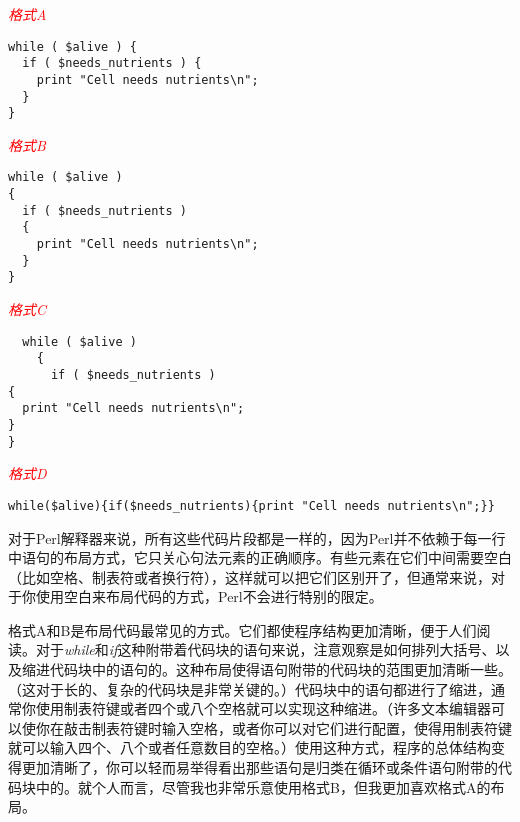 \textcolor{red}{\textit{格式A}}
\begin{adjustwidth}{4em}{}
\begin{lstlisting}
while ( $alive ) {
  if ( $needs_nutrients ) {
    print "Cell needs nutrients\n";
  }
}
\end{lstlisting}
\end{adjustwidth}

\textcolor{red}{\textit{格式B}}
\begin{adjustwidth}{4em}{}
\begin{lstlisting}
while ( $alive )
{
  if ( $needs_nutrients )
  {
    print "Cell needs nutrients\n";
  }
}
\end{lstlisting}
\end{adjustwidth}

\textcolor{red}{\textit{格式C}}
\begin{adjustwidth}{4em}{}
\begin{lstlisting}
  while ( $alive )
    {
      if ( $needs_nutrients )
{
  print "Cell needs nutrients\n";
}
}
\end{lstlisting}
\end{adjustwidth}

\textcolor{red}{\textit{格式D}}
\begin{adjustwidth}{4em}{}
\begin{lstlisting}
while($alive){if($needs_nutrients){print "Cell needs nutrients\n";}}
\end{lstlisting}
\end{adjustwidth}

对于Perl解释器来说，所有这些代码片段都是一样的，因为Perl并不依赖于每一行中语句的布局方式，它只关心句法元素的正确顺序。有些元素在它们中间需要空白（比如空格、制表符或者换行符），这样就可以把它们区别开了，但通常来说，对于你使用空白来布局代码的方式，Perl不会进行特别的限定。

格式A和B是布局代码最常见的方式。它们都使程序结构更加清晰，便于人们阅读。对于\textit{while}和\textit{if}这种附带着代码块的语句来说，注意观察是如何排列大括号、以及缩进代码块中的语句的。这种布局使得语句附带的代码块的范围更加清晰一些。（这对于长的、复杂的代码块是非常关键的。）代码块中的语句都进行了缩进，通常你使用制表符键或者四个或八个空格就可以实现这种缩进。（许多文本编辑器可以使你在敲击制表符键时输入空格，或者你可以对它们进行配置，使得用制表符键就可以输入四个、八个或者任意数目的空格。）使用这种方式，程序的总体结构变得更加清晰了，你可以轻而易举得看出那些语句是归类在循环或条件语句附带的代码块中的。就个人而言，尽管我也非常乐意使用格式B，但我更加喜欢格式A的布局。

